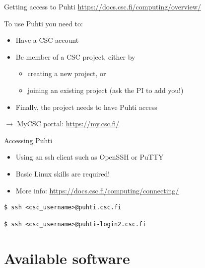 \documentclass[aspectratio=1610,14pt]{beamer}
\newcommand{\link}[1]{\alert{\url{#1}}}
\begin{document}
\begin{frame}{Getting access to Puhti}
  \link{https://docs.csc.fi/computing/overview/}

  \vspace{1em}

  To use Puhti you need to:
  \begin{itemize}
  \item Have a CSC account
  \item Be member of a CSC project, either by
    \begin{itemize}
    \item creating a new project, or
    \item joining an existing project (ask the PI to add you!)
    \end{itemize}
  \item Finally, the project needs to have Puhti access
  \end{itemize}

  \vspace{1em}

  $\rightarrow$ \quad MyCSC portal: \link{https://my.csc.fi/}

\end{frame}

\begin{frame}[fragile]{Accessing Puhti}
  \begin{itemize}
  \item Using an ssh client such as OpenSSH or PuTTY
  \item Basic Linux skills are required!
  \item More info: \link{https://docs.csc.fi/computing/connecting/}
  \end{itemize}

  \vspace{1em}

\begin{verbatim}
$ ssh <csc_username>@puhti.csc.fi
\end{verbatim}

\begin{verbatim}
$ ssh <csc_username>@puhti-login2.csc.fi
\end{verbatim}

\end{frame}

\section{Available software}
\end{document}
